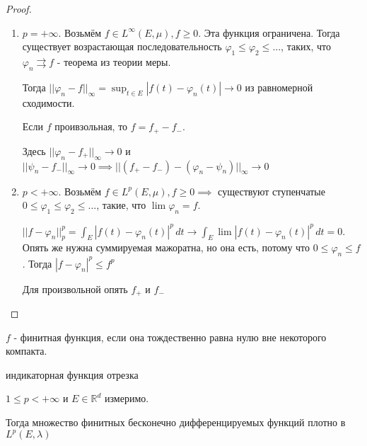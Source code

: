 \begin{proof}
    \begin{enumerate}
        \item {
            $p = +\infty$. Возьмём $f \in L^\infty (E, \mu), f \geqslant 0$. Эта функция ограничена.
            Тогда существует возрастающая последовательность $\varphi_1 \leqslant \varphi_2 \leqslant \ldots$, таких, что $\varphi_n \rightrightarrows f$ - теорема из теории меры.

            Тогда $||\varphi_n - f||_{\infty} = \sup_{t \in E} |f(t) - \varphi_n(t)| \rightarrow 0$ из равномерной сходимости.

            Если $f$ проивзольная, то $f = f_{+} - f_{-}$.

            Здесь $||\varphi_n - f_{+}||_\infty \rightarrow 0$ и $||\psi_n - f_{-}||_\infty \rightarrow 0 \implies ||(f_{+} - f_{-}) - (\varphi_n - \psi_n)||_\infty \rightarrow 0$
        }
        \item {
            $p < +\infty$. Возьмём $f \in L^p (E, \mu), f \geqslant 0 \implies $ существуют ступенчатые $0 \leqslant \varphi_1 \leqslant \varphi_2 \leqslant \ldots$, такие, что $\lim \varphi_n = f$.

            $||f - \varphi_n||_p^p = \int_E |f(t) - \varphi_n(t) |^p \, dt \rightarrow \int_E \lim |f(t) - \varphi_n(t) |^p \, dt = 0$.
            Опять же нужна суммируемая мажоратна, но она есть, потому что $0 \leqslant \varphi_n \leqslant f$. Тогда $|f - \varphi_n|^p \leqslant f^p$

            Для произвольной опять $f_{+}$ и $f_{-}$
        }
    \end{enumerate}
\end{proof}

\begin{definition}
    $f$ - финитная функция, если она тождественно равна нулю вне некоторого компакта.
    \begin{example}
        индикаторная функция отрезка
    \end{example}
\end{definition}

\begin{theorem}
    $1 \leqslant p < +\infty$ и $E \in \mathbb{R}^d$ измеримо.

    Тогда множество финитных бесконечно дифференцируемых функций плотно в $L^p (E, \lambda)$
\end{theorem}

